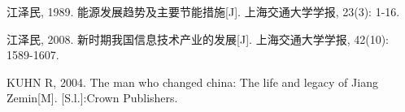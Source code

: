 \item 江泽民, 1989. 能源发展趋势及主要节能措施[J]. 上海交通大学学报, 23(3): 1-16.
\item 江泽民, 2008. 新时期我国信息技术产业的发展[J]. 上海交通大学学报, 42(10): 1589-1607.
\item KUHN R, 2004. The man who changed china: The life and legacy of Jiang Zemin[M]. [S.l.]:Crown Publishers.